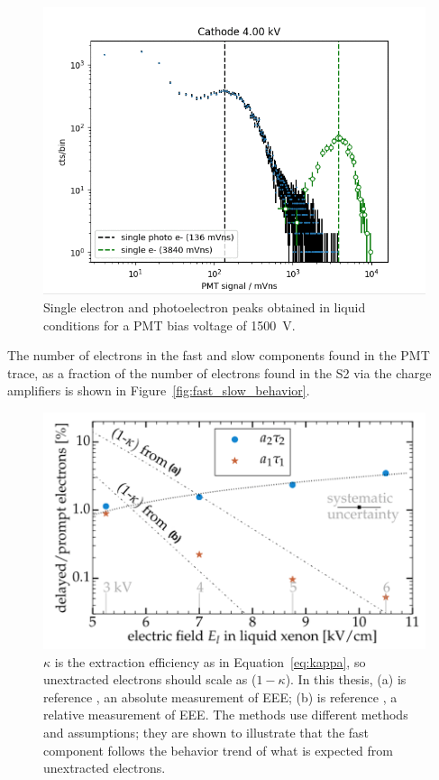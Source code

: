 \begin{figure}[htbp]
\begin{center}
\includegraphics[width=\textwidth]{figures/etrains/single_e.png}
\caption{Single electron and photoelectron peaks obtained in liquid conditions for a \ac{PMT} bias voltage of 1500~V.}
\label{fig:single_e}
\end{center}
\end{figure}

The number of electrons in the fast and slow components found in the \ac{PMT} trace, as a fraction of the number of electrons found in the S2 via the charge amplifiers is shown in Figure~\ref{fig:fast_slow_behavior}.


\begin{figure}[htbp]
\begin{center}
\includegraphics[width=\textwidth]{figures/etrains/etrain_result1.png}
\caption{$\kappa$ is the extraction efficiency as in Equation~\ref{eq:kappa}, so unextracted electrons should scale as ($1-\kappa$). In this thesis, (a) is reference \cite{Gushchin1982}, an absolute measurement of \ac{EEE}; (b) is reference \cite{Edwards2018}, a relative measurement of \ac{EEE}. The methods use different methods and assumptions; they are shown to illustrate that the fast component follows the behavior trend of what is expected from unextracted electrons.}
\label{fig:etrain_result1}
\end{center}
\end{figure}

